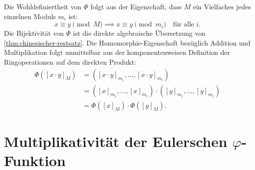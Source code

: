 \begin{math-stroke}

\begin{explanation-of-steps}
Die Wohldefiniertheit von $\Phi$ folgt aus der Eigenschaft, dass $M$ ein Vielfaches jedes einzelnen Moduls $m_i$ ist:
\[
x \equiv y \pmod M \implies x \equiv y \pmod{m_i} \quad \text{für alle } i.
\]
Die Bijektivität von $\Phi$ ist die direkte algebraische Übersetzung von \cref{thm:chinesischer-restsatz}. Die Homomorphie-Eigenschaft bezüglich Addition und Multiplikation folgt unmittelbar aus der komponentenweisen Definition der Ringoperationen auf dem direkten Produkt:
\begin{align*}
\Phi([x \cdot y]_M) &= \left( [x \cdot y]_{m_1}, \dots, [x \cdot y]_{m_r} \right) \\
&= \left( [x]_{m_1}, \dots, [x]_{m_r} \right) \cdot \left( [y]_{m_1}, \dots, [y]_{m_r} \right) \\
&= \Phi([x]_M) \cdot \Phi([y]_M).
\end{align*}
\end{explanation-of-steps}
\end{math-stroke}

\section{Multiplikativität der Eulerschen \texorpdfstring{$\varphi$}{phi}-Funktion}

